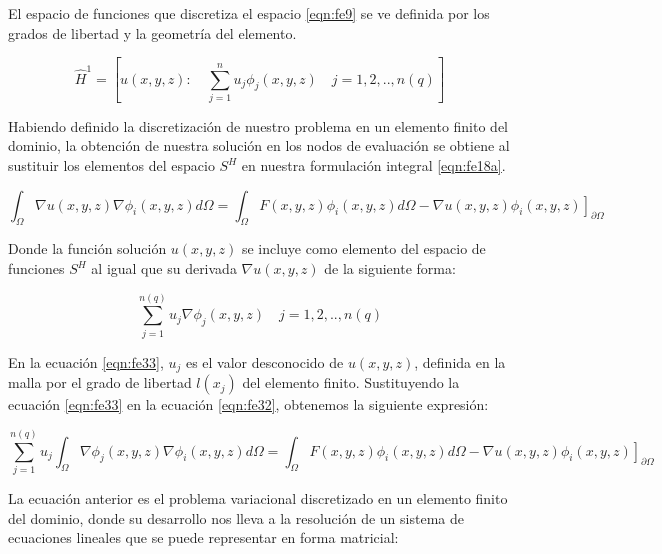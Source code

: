 El espacio de funciones que discretiza el espacio \eqref{eqn:fe9} se ve definida por los grados de libertad y la geometría del elemento. 

\begin{equation}
\label{eqn:fe31}
\hat{H}^{1}=  \left[ u(x,y,z) : \quad \displaystyle\sum_{j=1}^n  u_{j}\phi_{j}(x,y,z)  \quad  j=1,2,..,n(q)\right]     
\end{equation}
 
Habiendo definido la discretización de nuestro problema en un elemento finito del dominio, la obtención de nuestra solución en los nodos de evaluación se obtiene al sustituir los elementos del espacio $S^{H}$ en nuestra formulación integral \ref{eqn:fe18a}.

\begin{equation}
 \label{eqn:fe32}
\displaystyle\int_{\Omega}^{} {\nabla}u(x,y,z){\nabla}\phi_{i}(x,y,z)d\Omega   = \displaystyle\int_{\Omega}^{} F(x,y,z)\phi_{i}(x,y,z)d\Omega  - \left. \nabla{u(x,y,z)}\phi_{i}(x,y,z)\right]_{\partial{\Omega}}    
\end{equation}

Donde la función solución $u(x,y,z)$ se incluye como elemento del espacio de funciones $S^{H}$ al igual que su derivada ${\nabla}u(x,y,z)$ de la siguiente forma:

\begin{equation}
\label{eqn:fe33}
\displaystyle\sum_{j=1}^{n(q)}  u_{j}{\nabla}\phi_{j}(x,y,z)  \quad  j=1,2,..,n(q)     
     \end{equation}

En la ecuación \ref{eqn:fe33}, $u_{j}$ es el valor desconocido de $u(x,y,z)$, definida en la malla por el grado de libertad $l(x_{j})$ del elemento finito. Sustituyendo la ecuación \ref{eqn:fe33} en la ecuación \ref{eqn:fe32}, obtenemos la siguiente expresión:

\begin{equation}
 \label{eqn:fe34}
\displaystyle\sum_{j=1}^{n(q)} u_{j} \displaystyle\int_{\Omega}^{} {\nabla}\phi_{j}(x,y,z){\nabla}\phi_{i}(x,y,z)d\Omega   = \displaystyle\int_{\Omega}^{} F(x,y,z)\phi_{i}(x,y,z)d\Omega  - \left. \nabla{u(x,y,z)}\phi_{i}(x,y,z)\right]_{\partial{\Omega}}    
\end{equation}

La ecuación anterior es el problema variacional discretizado en un elemento finito del dominio, donde su desarrollo nos lleva a la resolución de un sistema de ecuaciones lineales que se puede representar en forma matricial:

